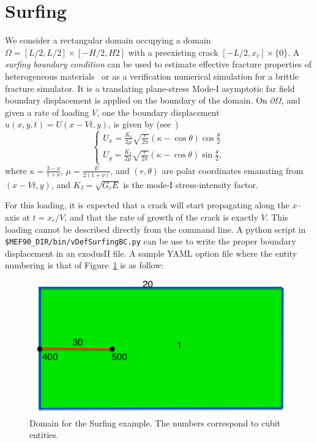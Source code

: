 \documentclass[10pt,oneside]{report}
\begin{document}
\section{Surfing}
We consider a rectangular domain occupying a domain $\Omega = [L/2,L/2] \times [-H/2,H2]$ with a preexisting crack $[-L/2,x_c] \times \{0\}$.
A \emph{surfing boundary condition} can be used to estimate effective fracture properties of heterogeneous materials~\cite{Hossein-Hsueh-EtAl-2014a} or as a verification numerical simulation for a brittle fracture simulator. 
It is a translating plane-stress Mode-I asymptotic far field boundary displacement is applied on the boundary of the domain. 
On $\partial \Omega$, and given a rate of loading $V$, one the boundary displacement $u(x,y,t) = U(x-Vt,y)$,  is given by (see~\cite{Zehnder-2012a})
\begin{equation}
\left\{
\begin{array}{l}
\displaystyle U_x = \frac{K_I}{2\mu}\sqrt{\frac{r}{2\pi}}(\kappa-\cos\theta)\cos{\frac{\theta}{2}}\\
\displaystyle U_y =\frac{K_I}{2\mu}\sqrt{\frac{r}{2\pi}}(\kappa-\cos\theta)\sin{\frac{\theta}{2}},
\end{array}
\right.
\end{equation}
where $\kappa = \frac{3-\nu}{1+\nu}$, $\mu = \frac{E}{2(1+\nu)}$, and $(r , \theta)$ are polar coordinates emanating from $(x-Vt,y)$, and $K_I = \sqrt{G_c E}$ is the mode-I stress-intensity factor.

For this loading, it is expected that a crack will start propagating along the $x$--axis at $t=x_c/V$, and that the rate of growth of the crack is exactly $V$.
This loading cannot be described directly from the command line. A python script in \verb+$MEF90_DIR/bin/vDefSurfingBC.py+ can be use to write the proper boundary displacement in an exodusII file. 
A sample YAML option file where the entity numbering is that of Figure~\ref{fig:Surfing} is as follow:
%

\begin{figure}[H]
\centering
\includegraphics[width=.45\textwidth]{Examples/Surfing/Geometry.png}
\caption{Domain for the Surfing example. The numbers correspond to cubit entities.}
\label{fig:Surfing}
\end{figure}
\end{document}
